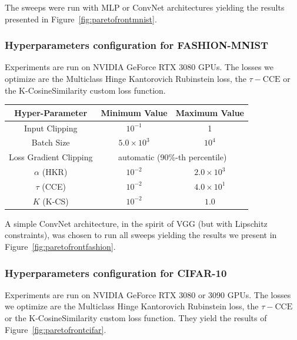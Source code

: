 The sweeps were run with MLP or ConvNet architectures yielding the results presented in Figure~\ref{fig:paretofrontmnist}. 

\subsubsection{Hyperparameters configuration for FASHION-MNIST}

 Experiments are run on NVIDIA GeForce RTX 3080 GPUs. The losses we optimize are the Multiclass Hinge Kantorovich Rubinstein loss, the $\tau-\text{CCE}$ or the K-CosineSimilarity custom loss function. 
 
\begin{center}
\begin{tabular}{|c c c|} 
 \hline
 Hyper-Parameter & Minimum Value & Maximum Value \\ [0.5ex] 
 \hline\hline
 Input Clipping & $10^{-1}$ & 1 \\ 
 \hline
 Batch Size & $5.0 \times 10^3$ & $10^4$ \\
 \hline
 Loss Gradient Clipping & \multicolumn{2}{c|}{automatic (90\%-th percentile)} \\
 \hline
 $\alpha$ (HKR) & $10^{-2}$ & $2.0 \times 10^3$ \\
 \hline
 $\tau$ (CCE) & $10^{-2}$ & $4.0 \times 10^{1}$ \\
 \hline
 $K$ (K-CS) & $10^{-2}$ & $1.0$ \\
 \hline
\end{tabular}
\end{center}

A simple ConvNet architecture, in the spirit of VGG (but with Lipschitz constraints), was chosen to run all sweeps yielding the results we present in Figure~\ref{fig:paretofrontfashion}.

\subsubsection{Hyperparameters configuration for CIFAR-10}

 Experiments are run on NVIDIA GeForce RTX 3080 or 3090 GPUs. The losses we optimize are the Multiclass Hinge Kantorovich Rubinstein loss, the $\tau-\text{CCE}$ or the K-CosineSimilarity custom loss function. They yield the results of Figure~\ref{fig:paretofrontcifar}.

